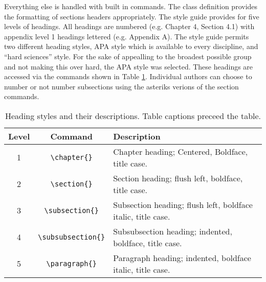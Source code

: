 \documentclass{thesis-dissertation}
\begin{document}
Everything else is handled with built in commands. The class definition provides the formatting of sections headers appropriately. The style guide provides for five levels of headings. All headings are numbered (e.g. Chapter 4, Section 4.1) with appendix level 1 headings lettered (e.g. Appendix A). The style guide permits two different heading styles, APA style which is available to every discipline, and ``hard sciences'' style. For the sake of appealling to the broadest possible group and not making this over hard, the APA style was selected. These headings are accessed via the commands shown in Table \ref{tab:heading-styles}. Individual authors can choose to number or not number subsections using the asteriks verions of the section commands.
\begin{table}[ht]
  \centering
  \caption{Heading styles and their descriptions. Table captions preceed the table.}
  \begin{tabular}{|c|c|l|}
    \hline
    \textbf{Level} & \textbf{Command} & \textbf{Description} \\
    \hline
    1 & \verb|\chapter{}| & Chapter heading; Centered, Boldface, title case. \\
    2 & \verb|\section{}| & Section heading; flush left, boldface, title case. \\
    3 & \verb|\subsection{}| & Subsection heading; flush left, boldface italic, title case. \\
    4 & \verb|\subsubsection{}| & Subsubsection heading; indented, boldface, title case. \\
    5 & \verb|\paragraph{}| & Paragraph heading; indented, boldface italic, title case. \\
    \hline
  \end{tabular}
  \label{tab:heading-styles}
\end{table}
\end{document}
